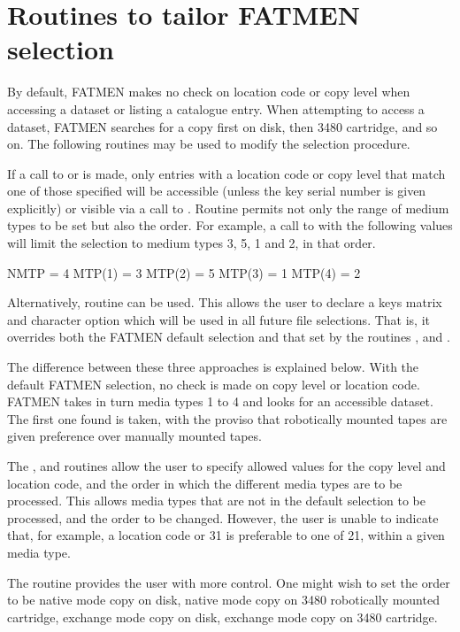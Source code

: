 \section{Routines to tailor FATMEN selection}
\par
By default, FATMEN makes no check on location code or copy
level when accessing a dataset or listing a catalogue entry.
When attempting to access a dataset, FATMEN searches
for a copy first on disk, then 3480 cartridge, and so on.
The following routines may be used to modify the selection
procedure.
\par
If a call to  or  is made, only entries with
a location code or copy level that match one of those
specified will be accessible (unless the key serial number
is given explicitly) or visible via a call to .
Routine  permits not only the range of medium
types to be set but also the order.
For example, a call to  with the following values
will limit the selection to medium types 3, 5, 1 and 2,
in that order.
\begin{XMP}
      NMTP = 4
      MTP(1) = 3
      MTP(2) = 5
      MTP(3) = 1
      MTP(4) = 2
\end{XMP}
\par
Alternatively, routine  can be used. This allows the
user to declare a keys matrix and character option which will
be used in all future file selections. That is, it overrides
both the FATMEN default selection and that set by the routines
,  and .
\par
The difference between these three approaches is explained below.
With the default FATMEN selection, no check is made on copy level
or location code. FATMEN takes in turn media types 1 to 4 and
looks for an accessible dataset. The first one found is taken,
with the proviso that robotically mounted tapes are given preference
over manually mounted tapes.
\par
The ,  and  routines allow the user to specify
allowed values for the copy level and location code, and the
order in which the different media types are to be processed.
This allows media types that are not in the default selection
to be processed, and the order to be changed. 
However, the user is unable to indicate that, for example,
a location code or 31 is preferable to one of 21, within
a given media type.
\par
The  routine provides the user with more control.
One might wish to set the order to be native mode copy
on disk, native mode copy on 3480 robotically mounted
cartridge, exchange mode copy on disk, exchange mode
copy on 3480 cartridge. 
